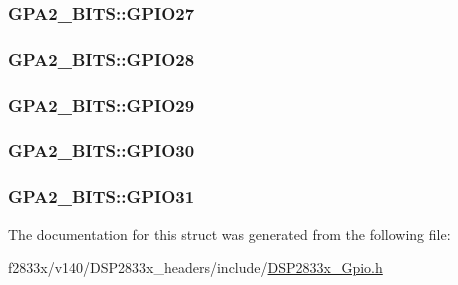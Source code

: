 \subsubsection[{G\+P\+I\+O27}]{ G\+P\+A2\+\_\+\+B\+I\+T\+S\+::\+G\+P\+I\+O27}\label{struct_g_p_a2___b_i_t_s_a0d372fdec8df1ab1359734b050761ad6}
\hypertarget{struct_g_p_a2___b_i_t_s_a371055b5684b12b54ac797367b24743f}{}
\subsubsection[{G\+P\+I\+O28}]{ G\+P\+A2\+\_\+\+B\+I\+T\+S\+::\+G\+P\+I\+O28}\label{struct_g_p_a2___b_i_t_s_a371055b5684b12b54ac797367b24743f}
\hypertarget{struct_g_p_a2___b_i_t_s_a36673659ad7e911860e50df8ce5221fd}{}
\subsubsection[{G\+P\+I\+O29}]{ G\+P\+A2\+\_\+\+B\+I\+T\+S\+::\+G\+P\+I\+O29}\label{struct_g_p_a2___b_i_t_s_a36673659ad7e911860e50df8ce5221fd}
\hypertarget{struct_g_p_a2___b_i_t_s_a19fb51642598c9b21cb79eff2c09c929}{}
\subsubsection[{G\+P\+I\+O30}]{ G\+P\+A2\+\_\+\+B\+I\+T\+S\+::\+G\+P\+I\+O30}\label{struct_g_p_a2___b_i_t_s_a19fb51642598c9b21cb79eff2c09c929}
\hypertarget{struct_g_p_a2___b_i_t_s_ae4a1fb2e1a0aec4792812fbd35f72a71}{}
\subsubsection[{G\+P\+I\+O31}]{ G\+P\+A2\+\_\+\+B\+I\+T\+S\+::\+G\+P\+I\+O31}\label{struct_g_p_a2___b_i_t_s_ae4a1fb2e1a0aec4792812fbd35f72a71}


The documentation for this struct was generated from the following file\+:\begin{DoxyCompactItemize}
\item 
f2833x/v140/\+D\+S\+P2833x\+\_\+headers/include/\hyperlink{_d_s_p2833x___gpio_8h}{D\+S\+P2833x\+\_\+\+Gpio.\+h}\end{DoxyCompactItemize}
